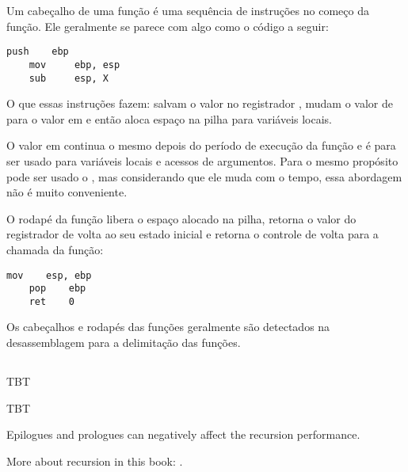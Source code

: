 \label{sec:prologepilog}
\myindex{\PTBRph{}} %
\myindex{\PTBRph{}} %

Um cabeçalho de uma função é uma sequência de instruções no começo da função. Ele geralmente se parece com algo como o código a seguir:

\begin{lstlisting}[style=customasmx86]
    push    ebp
    mov     ebp, esp
    sub     esp, X
\end{lstlisting}

O que essas instruções fazem: salvam o valor no registrador \EBP, mudam o valor de \EBP para o valor em \ESP e então aloca espaço na pilha para variáveis locais.

O valor em \EBP continua o mesmo depois do período de execução da função e é para ser usado para variáveis locais e acessos de argumentos.
Para o mesmo propósito pode ser usado o \ESP, mas considerando que ele muda com o tempo, essa abordagem não é muito conveniente.

O rodapé da função libera o espaço alocado na pilha, retorna o valor do registrador \EBP de volta ao seu estado inicial e retorna o controle de volta para a chamada da função:

\begin{lstlisting}[style=customasmx86]
    mov    esp, ebp
    pop    ebp
    ret    0
\end{lstlisting}

Os cabeçalhos e rodapés das funções geralmente são detectados na desassemblagem para a delimitação das funções.

\subsection{\Recursion}

\ac{TBT}

\myindex{\Recursion}
\ac{TBT}

Epilogues and prologues can negatively affect the recursion performance.

More about recursion in this book: .

